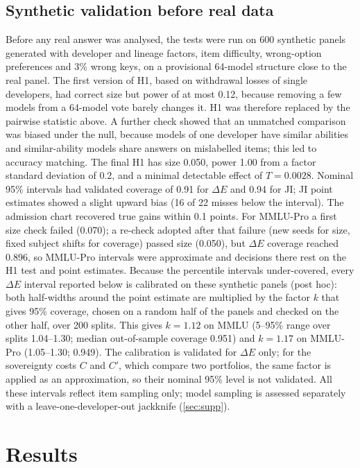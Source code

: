 \documentclass[preprint,12pt,authoryear]{elsarticle}
\newcommand{\dE}{\Delta E}
\begin{document}
\subsection{Synthetic validation before real data}
Before any real answer was analysed, the tests were run on 600 synthetic panels generated with developer and lineage factors, item difficulty, wrong-option preferences and 3\% wrong keys, on a provisional 64-model structure close to the real panel. The first version of H1, based on withdrawal losses of single developers, had correct size but power of at most 0.12, because removing a few models from a 64-model vote barely changes it. H1 was therefore replaced by the pairwise statistic above. A further check showed that an unmatched comparison was biased under the null, because models of one developer have similar abilities and similar-ability models share answers on mislabelled items; this led to accuracy matching. The final H1 has size 0.050, power 1.00 from a factor standard deviation of 0.2, and a minimal detectable effect of $T=0.0028$. Nominal 95\% intervals had validated coverage of 0.91 for $\dE$ and 0.94 for JI; JI point estimates showed a slight upward bias (16 of 22 misses below the interval). The admission chart recovered true gains within 0.1 points. For MMLU-Pro a first size check failed (0.070); a re-check adopted after that failure (new seeds for size, fixed subject shifts for coverage) passed size (0.050), but $\dE$ coverage reached 0.896, so MMLU-Pro intervals were approximate and decisions there rest on the H1 test and point estimates. Because the percentile intervals under-covered, every $\dE$ interval reported below is calibrated on these synthetic panels (post hoc): both half-widths around the point estimate are multiplied by the factor $k$ that gives 95\% coverage, chosen on a random half of the panels and checked on the other half, over 200 splits. This gives $k = 1.12$ on MMLU (5--95\% range over splits 1.04--1.30; median out-of-sample coverage 0.951) and $k = 1.17$ on MMLU-Pro (1.05--1.30; 0.949). The calibration is validated for $\dE$ only; for the sovereignty costs $C$ and $C'$, which compare two portfolios, the same factor is applied as an approximation, so their nominal 95\% level is not validated. All these intervals reflect item sampling only; model sampling is assessed separately with a leave-one-developer-out jackknife (\ref{sec:supp}).

\section{Results}
\end{document}

